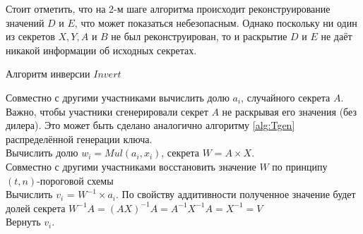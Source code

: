\documentclass[a4paper,12pt]{article}
\theoremstyle{definition}
\begin{document}
		Стоит отметить, что на 2-м шаге алгоритма %
		происходит реконструирование значений $D$ и $E$, что может показаться небезопасным. Однако поскольку ни один из секретов $X, Y, A$ и $B$ не был реконструирован, то и раскрытие $D$ и $E$ не даёт никакой информации об исходных секретах.
		
		\begin{algorithm}
			\caption{Алгоритм инверсии $Invert$}
			\label{alg:Tinv}
			
			
			Совместно с другими участниками вычислить долю $a_i$, случайного секрета $A$. Важно, чтобы участники сгенерировали секрет $A$ не раскрывая его значения (без дилера).
			Это может быть сделано аналогично алгоритму \ref{alg:Tgen} распределённой генерации ключа. 
			\\Вычислить долю $w_i = Mul(a_i, x_i)$, секрета $W=A\times X$.
			\\Совместно с другими участниками восстановить значение $W$ по принципу $(t, n)$-пороговой схемы 
			\\Вычислить $v_i$ = $W^{-1}\times a_i$. \linebreak
			По свойству аддитивности полученное значение будет долей секрета 
			$W^{-1} A = (A X)^{-1}A = A^{-1} X^{-1} A = X^{-1} = V$
			\\Вернуть $v_i$.
			
			
		\end{algorithm}	
	
	
\end{document}
